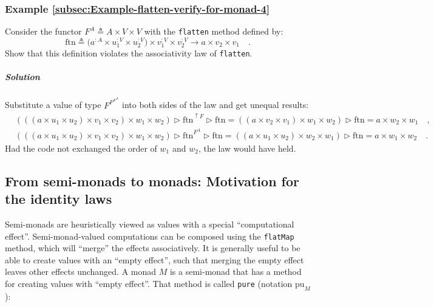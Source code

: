 \subsubsection{Example \label{subsec:Example-flatten-verify-for-monad-4}\ref{subsec:Example-flatten-verify-for-monad-4}}

Consider the functor $F^{A}\triangleq A\times V\times V$ with the
\lstinline!flatten! method defined by:
\[
\text{ftn}\triangleq\big(a^{:A}\times u_{1}^{:V}\times u_{2}^{:V}\big)\times v_{1}^{:V}\times v_{2}^{:V}\rightarrow a\times v_{2}\times v_{1}\quad.
\]
Show that this definition violates the associativity law of \lstinline!flatten!.

\subparagraph{Solution}

Substitute a value of type $F^{F^{F^{A}}}$ into both sides of the
law and get unequal results:
\begin{align*}
 & \left(\left(\left(a\times u_{1}\times u_{2}\right)\times v_{1}\times v_{2}\right)\times w_{1}\times w_{2}\right)\triangleright\text{ftn}^{\uparrow F}\triangleright\text{ftn}=\left(\left(a\times v_{2}\times v_{1}\right)\times w_{1}\times w_{2}\right)\triangleright\text{ftn}=a\times w_{2}\times w_{1}\quad,\\
 & \left(\left(\left(a\times u_{1}\times u_{2}\right)\times v_{1}\times v_{2}\right)\times w_{1}\times w_{2}\right)\triangleright\text{ftn}^{F^{A}}\triangleright\text{ftn}=\left(\left(a\times u_{1}\times u_{2}\right)\times w_{2}\times w_{1}\right)\triangleright\text{ftn}=a\times w_{1}\times w_{2}\quad.
\end{align*}
Had the code not exchanged the order of $w_{1}$ and $w_{2}$, the
law would have held.

\subsection{From semi-monads to monads: Motivation for the identity laws}

Semi-monads are heuristically viewed as values with a special \textsf{``}computational
effect\textsf{''}. Semi-monad-valued computations can be composed using the
\lstinline!flatMap! method, which will \textsf{``}merge\textsf{''} the effects associatively.
It is generally useful to be able to create values with an \textsf{``}empty
effect\textsf{''}, such that merging the empty effect leaves other effects
unchanged. A monad $M$ is a semi-monad that has a method for creating
values with \textsf{``}empty effect\textsf{''}. That method is called \lstinline!pure!
(notation $\text{pu}_{M}$):

